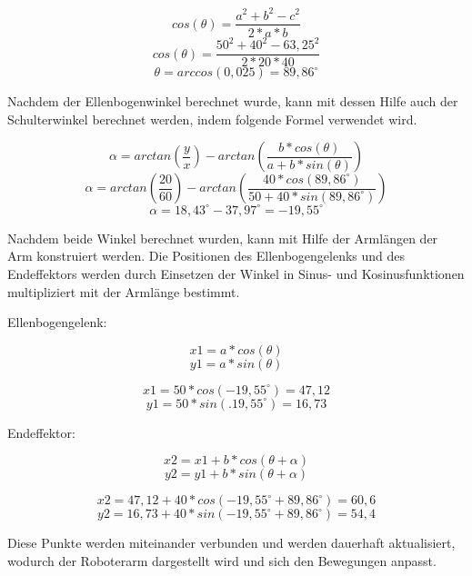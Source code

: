 \documentclass[12pt]{article}
\begin{document}
                    \[
                        cos(\theta)= \frac{a^2+b^2-c^2}{2*a*b}
                    \]
                    \[
                        cos(\theta)= \frac{50^2+40^2-63,25^2}{2*20*40}
                    \]
                    \[
                        \theta= arccos(0,025) = 89,86^\circ
                    \]

                    Nachdem der Ellenbogenwinkel berechnet wurde, kann mit dessen Hilfe auch der Schulterwinkel
                    berechnet werden, indem folgende Formel verwendet wird.

                    \[
                        \alpha = arctan(\frac{y}{x}) - arctan(\frac{b*cos(\theta)}{a+b*sin(\theta)})
                    \]
                    \[
                        \alpha = arctan(\frac{20}{60}) - arctan(\frac{40*cos(89,86^\circ)}{50+40*sin(89,86^\circ)})                    \]
                    \[
                        \alpha = 18,43^\circ - 37,97^\circ = -19,55^\circ
                    \]

                    Nachdem beide Winkel berechnet wurden, kann mit Hilfe der Armlängen der Arm konstruiert werden.
                    Die Positionen des Ellenbogengelenks und des Endeffektors werden durch Einsetzen der Winkel in
                    Sinus- und Kosinusfunktionen multipliziert mit der Armlänge bestimmt.

                    Ellenbogengelenk:

                    \[
                        x1 = a * cos(\theta)
                    \]
                    \[
                        y1 = a * sin(\theta)
                    \]

                    \[
                        x1 = 50 * cos(-19,55^\circ) = 47,12
                    \]
                    \[
                        y1 = 50 * sin(.19,55^\circ) = 16,73
                    \]

                    Endeffektor:

                    \[
                        x2 = x1 + b * cos(\theta + \alpha)
                    \]
                    \[
                        y2 = y1 + b * sin(\theta + \alpha)
                    \]

                    \[
                        x2 = 47,12 + 40 * cos(-19,55^\circ + 89,86^\circ) = 60,6
                    \]
                    \[
                        y2 = 16,73 + 40 * sin(-19,55^\circ + 89,86^\circ) = 54,4
                    \]

                    Diese Punkte werden miteinander verbunden und werden dauerhaft aktualisiert, wodurch der
                    Roboterarm dargestellt wird und sich den Bewegungen anpasst.
\end{document}
